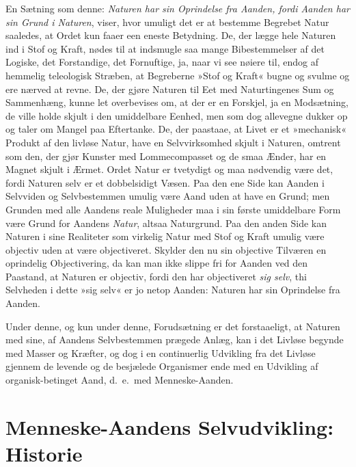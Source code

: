 \documentclass[12pt]{book}
\newcommand{\apage}[1]{\marginnote{\footnotesize\textit{[#1]}}}
\begin{document}
En Sætning som denne: \emph{Naturen har sin Oprindelse fra Aanden, fordi Aanden
har sin Grund i Naturen}, viser, hvor umuligt det er at bestemme Begrebet
Natur saaledes, at Ordet kun faaer een eneste Betydning. De, der lægge hele
Naturen ind i Stof og Kraft, nødes til at indsmugle saa mange Bibestemmelser
af det Logiske, det Forstandige, det Fornuftige, ja, naar vi see nøiere
til, endog af hemmelig teleologisk Stræben, at Begreberne »Stof og Kraft«
bugne og svulme og ere nærved at revne. De, der gjøre Naturen til Eet med
Naturtingenes Sum og Sammenhæng, kunne let overbevises om, at der er en
\apage{229} Forskjel, ja en Modsætning, de ville holde skjult i den umiddelbare Eenhed,
men som dog allevegne dukker op og taler om Mangel paa Eftertanke. De, der
paastaae, at Livet er et »mechanisk« Produkt af den livløse Natur, have en
Selvvirksomhed skjult i Naturen, omtrent som den, der gjør Kunster med
Lommecompasset og de smaa Ænder, har en Magnet skjult i Ærmet. Ordet Natur
er tvetydigt og maa nødvendig være det, fordi Naturen selv er et
dobbelsidigt Væsen. Paa den ene Side kan Aanden i Selvviden og Selvbestemmen
umulig være Aand uden at have en Grund; men Grunden med alle Aandens reale
Muligheder maa i sin første umiddelbare Form være Grund for Aandens \emph{Natur},
altsaa Naturgrund. Paa den anden Side kan Naturen i sine Realiteter som
virkelig Natur med Stof og Kraft umulig være objectiv uden at være
objectiveret. Skylder den nu sin objective Tilværen en oprindelig
Objectivering, da kan man ikke slippe fri for Aanden ved den Paastand, at
Naturen er objectiv, fordi den har objectiveret \emph{sig selv}, thi Selvheden i
dette »sig selv« er jo netop Aanden: Naturen har sin Oprindelse fra Aanden.

Under denne, og kun under denne, Forudsætning er det forstaaeligt, at
Naturen med sine, af Aandens Selvbestemmen prægede Anlæg, kan i det Livløse
begynde med Masser og Kræfter, og dog i en continuerlig Udvikling fra det
Livløse gjennem de levende og de besjælede Organismer ende med en Udvikling
af organisk-betinget Aand, d.\ e.\ med Menneske-Aanden.

\apage{230} \section{Menneske-Aandens Selvudvikling: Historie}
\label{sec:22}
\end{document}
